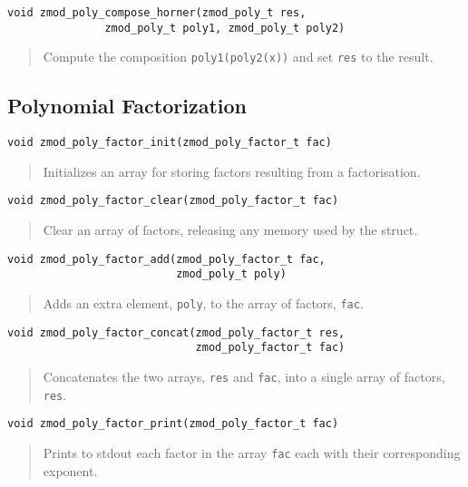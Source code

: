 \documentclass[a4paper,10pt]{article}
\newcommand{\code}{\lstinline}
\begin{document}
\begin{lstlisting}
void zmod_poly_compose_horner(zmod_poly_t res, 
               zmod_poly_t poly1, zmod_poly_t poly2)
\end{lstlisting}
\begin{quote}
Compute the composition \code{poly1(poly2(x))} and set \code{res} to the result.
\end{quote}

\subsection{Polynomial Factorization}

\begin{lstlisting}
void zmod_poly_factor_init(zmod_poly_factor_t fac)
\end{lstlisting}
\begin{quote}
Initializes an array for storing factors resulting from a factorisation.  \end{quote}

\begin{lstlisting}
void zmod_poly_factor_clear(zmod_poly_factor_t fac)
\end{lstlisting}
\begin{quote}
Clear an array of factors, releasing any memory used by the struct.
\end{quote}

\begin{lstlisting}
void zmod_poly_factor_add(zmod_poly_factor_t fac,
                          zmod_poly_t poly)
\end{lstlisting}
\begin{quote}
Adds an extra element, \code{poly}, to the array of factors, \code{fac}.  
\end{quote}

\begin{lstlisting}
void zmod_poly_factor_concat(zmod_poly_factor_t res,
                             zmod_poly_factor_t fac)
\end{lstlisting}
\begin{quote}
Concatenates the two arrays, \code{res} and \code{fac}, into a single array of factors, \code{res}.  
\end{quote}

\begin{lstlisting}
void zmod_poly_factor_print(zmod_poly_factor_t fac)
\end{lstlisting}
\begin{quote}
Prints to stdout each factor in the array \code{fac} each with their corresponding exponent.
\end{quote}
\end{document}
